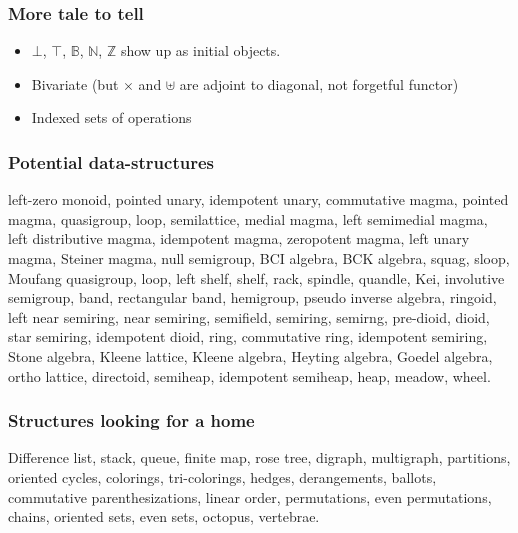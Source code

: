 \documentclass[serif,mathserif,professionalfont,10pt]{beamer}
\newcommand{\sred}[1]{\textcolor{slidered}{#1}}
\begin{document}
\begin{frame}
\frametitle{More tale to tell}
\begin{itemize}
\item $\bot$, $\top$, $\mathbb{B}$, $\mathbb{N}$, $\mathbb{Z}$ show up
as \sred{initial objects}.
\item Bivariate (but $\times$ and $\uplus$ are adjoint to diagonal,
  not forgetful functor)
\item Indexed sets of operations
\end{itemize}
\end{frame}

\begin{frame}
\frametitle{Potential data-structures}
\sred{left-zero monoid}, pointed unary, idempotent unary, commutative
magma, pointed magma, quasigroup, loop, semilattice, medial magma,
left semimedial magma, left distributive magma, idempotent magma,
zeropotent magma, left unary magma, Steiner magma, null semigroup, BCI algebra, BCK
algebra, squag, sloop, Moufang quasigroup, loop, left shelf, shelf,
rack, spindle, quandle, Kei, involutive semigroup, band, rectangular
band, hemigroup, pseudo inverse algebra, ringoid, left near semiring,
near semiring, semifield, semiring, semirng, pre-dioid, dioid, star semiring,
idempotent dioid, ring, commutative ring, idempotent semiring, Stone algebra,
Kleene lattice, Kleene algebra, Heyting algebra, Goedel algebra, ortho
lattice, directoid, semiheap, idempotent semiheap, heap, meadow, wheel.
\end{frame}

\begin{frame}
\frametitle{Structures looking for a home}
Difference list, stack, queue, finite map, rose tree, digraph,
multigraph, partitions, oriented cycles, colorings, tri-colorings,
hedges, derangements, ballots, commutative parenthesizations, linear
order, permutations, even permutations, chains, oriented sets, even
sets, octopus, vertebrae.
\end{frame}
\end{document}
